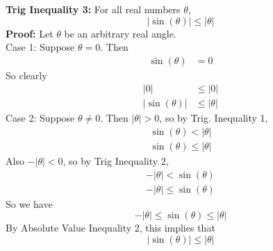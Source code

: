 \documentclass{article}
\begin{document}
	\textbf{Trig Inequality 3:} For all real numbers $\theta$,
	$$|\sin{(\theta)}| \leq |\theta|$$
	\textbf{Proof:} Let $\theta$ be an arbitrary real angle. \\
	Case 1: Suppose $\theta = 0$. Then
	\begin{align*}
		\sin{(\theta)} &= 0
	\end{align*}
	So clearly
	\begin{align*}
		|0| &\leq |0| \\
		|\sin{(\theta)}| &\leq |\theta|
	\end{align*}
	Case 2: Suppose $\theta \neq 0$. Then $|\theta| > 0$, so by Trig. Inequality 1,
	\begin{align*}
		\sin{(\theta)} < |\theta| \\
		\sin{(\theta)} \leq |\theta|
	\end{align*}
	Also $-|\theta| < 0$, so by Trig Inequality 2,
	\begin{align*}
		-|\theta| < \sin{(\theta)} \\
		-|\theta| \leq \sin{(\theta)}
	\end{align*}
	So we have
	$$-|\theta| \leq \sin{(\theta)} \leq |\theta|$$
	By Absolute Value Inequality 2, this implies that
	$$|\sin{(\theta)}| \leq |\theta|$$
\end{document}
